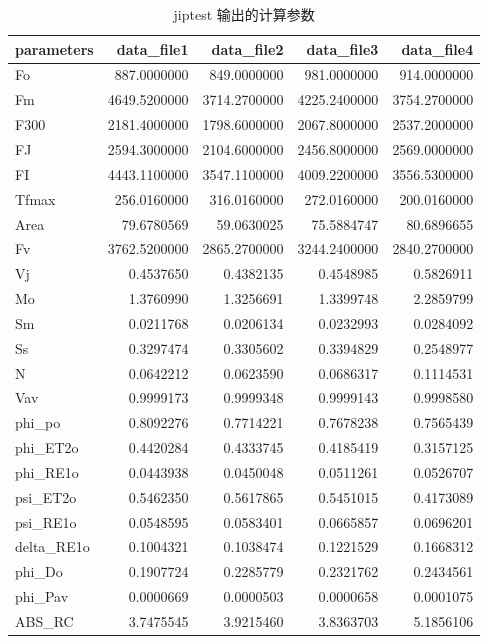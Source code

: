 \documentclass[]{krantz}
\theoremstyle{definition}
\theoremstyle{definition}
\theoremstyle{definition}
\theoremstyle{remark}
\begin{document}
\begin{longtable}[t]{lrrrr}
\caption{\label{tab:jipres}jiptest 输出的计算参数}\\
\toprule
parameters & data\_file1 & data\_file2 & data\_file3 & data\_file4\\
\midrule
Fo & 887.0000000 & 849.0000000 & 981.0000000 & 914.0000000\\
Fm & 4649.5200000 & 3714.2700000 & 4225.2400000 & 3754.2700000\\
F300 & 2181.4000000 & 1798.6000000 & 2067.8000000 & 2537.2000000\\
FJ & 2594.3000000 & 2104.6000000 & 2456.8000000 & 2569.0000000\\
FI & 4443.1100000 & 3547.1100000 & 4009.2200000 & 3556.5300000\\
\addlinespace
Tfmax & 256.0160000 & 316.0160000 & 272.0160000 & 200.0160000\\
Area & 79.6780569 & 59.0630025 & 75.5884747 & 80.6896655\\
Fv & 3762.5200000 & 2865.2700000 & 3244.2400000 & 2840.2700000\\
Vj & 0.4537650 & 0.4382135 & 0.4548985 & 0.5826911\\
Mo & 1.3760990 & 1.3256691 & 1.3399748 & 2.2859799\\
\addlinespace
Sm & 0.0211768 & 0.0206134 & 0.0232993 & 0.0284092\\
Ss & 0.3297474 & 0.3305602 & 0.3394829 & 0.2548977\\
N & 0.0642212 & 0.0623590 & 0.0686317 & 0.1114531\\
Vav & 0.9999173 & 0.9999348 & 0.9999143 & 0.9998580\\
phi\_po & 0.8092276 & 0.7714221 & 0.7678238 & 0.7565439\\
\addlinespace
phi\_ET2o & 0.4420284 & 0.4333745 & 0.4185419 & 0.3157125\\
phi\_RE1o & 0.0443938 & 0.0450048 & 0.0511261 & 0.0526707\\
psi\_ET2o & 0.5462350 & 0.5617865 & 0.5451015 & 0.4173089\\
psi\_RE1o & 0.0548595 & 0.0583401 & 0.0665857 & 0.0696201\\
delta\_RE1o & 0.1004321 & 0.1038474 & 0.1221529 & 0.1668312\\
\addlinespace
phi\_Do & 0.1907724 & 0.2285779 & 0.2321762 & 0.2434561\\
phi\_Pav & 0.0000669 & 0.0000503 & 0.0000658 & 0.0001075\\
ABS\_RC & 3.7475545 & 3.9215460 & 3.8363703 & 5.1856106\\

\end{longtable}
\end{document}
